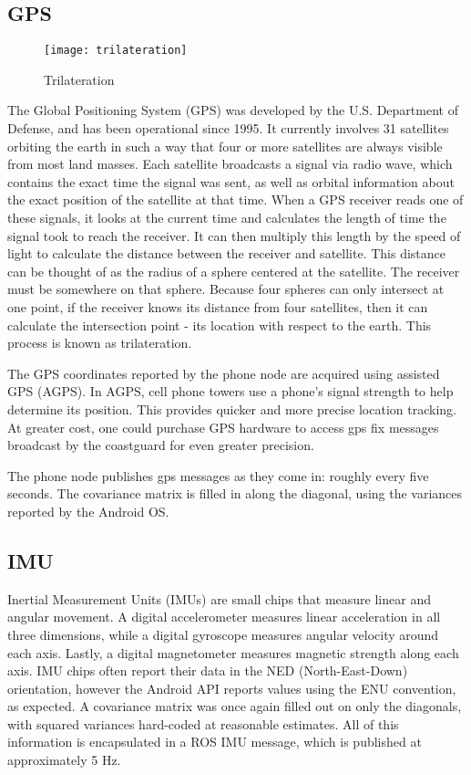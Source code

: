 \subsection{GPS}
\begin{wrapfigure}{L}{0.5\textwidth} 
	\caption{Trilateration \cite{GPS_trilateration}}
	\centering
	\texttt{[image: trilateration]}
\end{wrapfigure}

The Global Positioning System (GPS) was developed by the U.S. Department of Defense, and has been operational since 1995. It currently involves 31 satellites orbiting the earth in such a way that four or more satellites are always visible from most land masses. Each satellite broadcasts a signal via radio wave, which contains the exact time the signal was sent, as well as orbital information about the exact position of the satellite at that time. When a GPS receiver reads one of these signals, it looks at the current time and calculates the length of time the signal took to reach the receiver. It can then multiply this length by the speed of light to calculate the distance between the receiver and satellite. This distance can be thought of as the radius of a sphere centered at the satellite. The receiver must be somewhere on that sphere. Because four spheres can only intersect at one point, if the receiver knows its distance from four satellites, then it can calculate the intersection point - its location with respect to the earth. This process is known as trilateration. \cite{GPS_trilateration}

The GPS coordinates reported by the phone node are acquired using assisted GPS (AGPS). In AGPS, cell phone towers use a phone's signal strength to help determine its position. This provides quicker and more precise location tracking. At greater cost, one could purchase GPS hardware to access gps fix messages broadcast by the coastguard for even greater precision.

The phone node publishes gps messages as they come in: roughly every five seconds. The covariance matrix is filled in along the diagonal, using the variances reported by the Android OS.

\subsection{IMU}

Inertial Measurement Units (IMUs) are small chips that measure linear and angular movement. A digital accelerometer measures linear acceleration in all three dimensions, while a digital gyroscope measures angular velocity around each axis. Lastly, a digital magnetometer measures magnetic strength along each axis. IMU chips often report their data in the NED (North-East-Down) orientation, however the Android API reports values using the ENU convention, as expected. A covariance matrix was once again filled out on only the diagonals, with squared variances hard-coded at reasonable estimates. All of this information is encapsulated in a ROS IMU message, which is published at approximately 5 Hz. 

